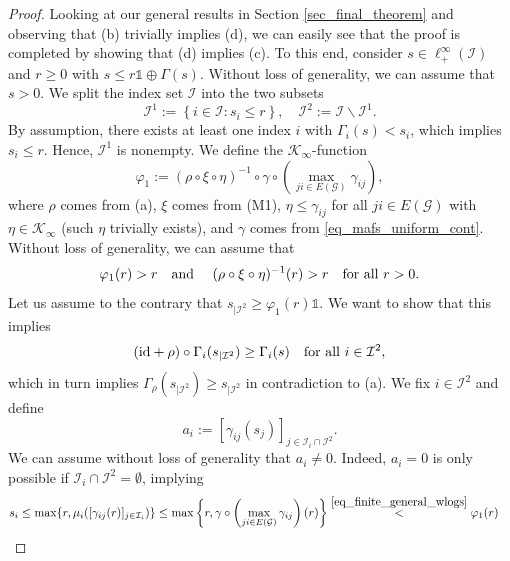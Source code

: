 \documentclass[10pt, oneside, a4paper]{article}
\newcommand{\unit}{\mathds{1}}
\newcommand{\id}{\mathrm{id}}
\newcommand{\GC}{\mathcal{G}}
\newcommand{\IC}{\mathcal{I}}
\newcommand{\KC}{\mathcal{K}}
\begin{document}
\begin{proof}
Looking at our general results in Section \ref{sec_final_theorem} and observing that (b) trivially implies (d), we can easily see that the proof is completed by showing that (d) implies (c). To this end, consider $s \in \ell^{\infty}_+(\IC)$ and $r \geq 0$ with $s \leq r\unit \oplus \Gamma(s)$. Without loss of generality, we can assume that $s > 0$. We split the index set $\IC$ into the two subsets%
\begin{equation*}
  \IC^1 := \left\{ i \in \IC : s_i \leq r \right\},\quad \IC^2 := \IC \backslash \IC^1.%
\end{equation*}
By assumption, there exists at least one index $i$ with $\Gamma_i(s) < s_i$, which implies $s_i \leq r$. Hence, $\IC^1$ is nonempty. We define the $\KC_{\infty}$-function%
\begin{equation*}
  \varphi_1 := (\rho \circ \xi \circ \eta)^{-1} \circ \gamma \circ \left(\max_{ji \in E(\GC)}\gamma_{ij}\right),%
\end{equation*}
where $\rho$ comes from (a), $\xi$ comes from (M1), $\eta \leq \gamma_{ij}$ for all $ji \in E(\GC)$ with $\eta \in \KC_{\infty}$ (such $\eta$ trivially exists), and $\gamma$ comes from \eqref{eq_mafs_uniform_cont}. Without loss of generality, we can assume that%
\begin{equation}\label{eq_finite_general_wlogs}
  \varphi_1(r) > r \mbox{\quad and \quad} (\rho \circ \xi \circ \eta)^{-1}(r) > r \mbox{\quad for all\ } r > 0.%
\end{equation}
Let us assume to the contrary that $s_{|\IC^2} \geq \varphi_1(r)\unit$. We want to show that this implies%
\begin{equation*}
  (\id + \rho) \circ \Gamma_i(s_{|\IC^2}) \geq \Gamma_i(s) \mbox{\quad for all\ } i \in \IC^2,%
\end{equation*}
which in turn implies $\Gamma_{\rho}(s_{|\IC^2}) \geq s_{|\IC^2}$ in contradiction to (a). We fix $i \in \IC^2$ and define%
\begin{equation*}
  a_i := [\gamma_{ij}(s_j)]_{j \in \IC_i \cap \IC^2}.%
\end{equation*}
We can assume without loss of generality that $a_i \neq 0$. Indeed, $a_i = 0$ is only possible if $\IC_i \cap \IC^2 = \emptyset$, implying%
\begin{align*}
  s_i &\leq \max\{r,\mu_i([\gamma_{ij}(r)]_{j \in \IC_i})\} \leq \max\left\{r, \gamma \circ  \left(\max_{ji \in E(\GC)}\gamma_{ij}\right)(r) \right\} \stackrel{\eqref{eq_finite_general_wlogs}}{<} \varphi_1(r)%
\end{align*}

\end{proof}
\end{document}

